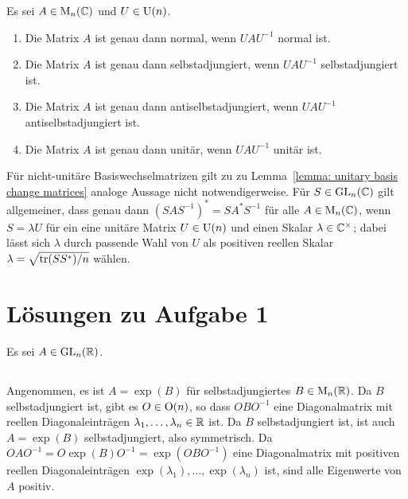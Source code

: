 \documentclass[a4paper, 10pt, numbers=noenddot]{scrartcl}
\begin{document}
\begin{corollary}
  Es sei $A \in \operatorname{M}_n(\mathbb{C})$ und $U \in \operatorname{U}(n)$.
  \begin{enumerate}[leftmargin=*]
    \item
      Die Matrix $A$ ist genau dann normal, wenn $U \! A U^{-1}$ normal ist.
    \item
      Die Matrix $A$ ist genau dann selbstadjungiert, wenn $U \! A U^{-1}$ selbstadjungiert ist.
    \item
      Die Matrix $A$ ist genau dann antiselbstadjungiert, wenn $U \! A U^{-1}$ antiselbstadjungiert ist.
    \item
      Die Matrix $A$ ist genau dann unitär, wenn $U \! A U^{-1}$ unitär ist.
  \end{enumerate}
\end{corollary}


\begin{remark}
  Für nicht-unitäre Basiswechselmatrizen gilt zu zu Lemma~\ref{lemma: unitary basis change matrices} analoge Aussage nicht notwendigerweise.
  Für $S \in \operatorname{GL}_n(\mathbb{C})$ gilt allgemeiner, dass genau dann $(S A S^{-1})^* = S A^* S^{-1}$ für alle $A \in \operatorname{M}_n(\mathbb{C})$, wenn $S = \lambda U$ für ein eine unitäre Matrix $U \in \operatorname{U}(n)$ und einen Skalar $\lambda \in \mathbb{C}^\times$; dabei lässt sich $\lambda$ durch passende Wahl von $U$ als positiven reellen Skalar $\lambda = \sqrt{\operatorname{tr}(SS^*)/n}$ wählen.
\end{remark}










\section{Lösungen zu Aufgabe 1}


Es sei $A \in \operatorname{GL}_n(\mathbb{R})$.





\subsection{}

Angenommen, es ist $A = \exp(B)$ für selbstadjungiertes $B \in \operatorname{M}_n(\mathbb{R})$.
Da $B$ selbstadjungiert ist, gibt es $O \in \operatorname{O}(n)$, so dass $O B O^{-1}$ eine Diagonalmatrix mit reellen Diagonaleinträgen $\lambda_1, \dotsc, \lambda_n \in \mathbb{R}$ ist.
Da $B$ selbstadjungiert ist, ist auch $A = \exp(B)$ selbstadjungiert, also symmetrisch.
Da $O A O^{-1} = O \exp(B) O^{-1} = \exp(O B O^{-1})$ eine Diagonalmatrix mit positiven reellen Diagonaleinträgen $\exp(\lambda_1), \dotsc, \exp(\lambda_n)$ ist, sind alle Eigenwerte von $A$ positiv.
\end{document}
